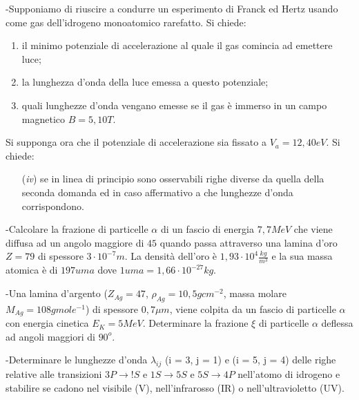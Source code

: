 \documentclass[12pt,twoside,a4]{article}
\begin{document}
\begin{esercizio}
	-Supponiamo di riuscire a condurre un esperimento di Franck ed Hertz usando come gas dell'idrogeno monoatomico rarefatto. Si chiede:
	\begin{enumerate}[label=(\textit{\roman*})]
		\item il minimo potenziale di accelerazione al quale il gas comincia ad emettere luce;
		\item la lunghezza d'onda della luce emessa a questo potenziale;
		\item quali lunghezze d'onda vengano emesse se il gas è immerso in un campo magnetico $B=5,10 T$.
	\end{enumerate}
	Si supponga ora che il potenziale di accelerazione sia fissato a $V_a=12,40 eV$. Si chiede:
	\begin{enumerate}[label=(\textit{\roman*})]
		\item[(\textit{iv})] se in linea di principio sono osservabili righe diverse da quella della seconda domanda ed in caso affermativo a che lunghezze d'onda corrispondono.
	\end{enumerate}
\end{esercizio}

\newpage
\begin{esercizio}
	-Calcolare la frazione di particelle $\alpha$ di un fascio di energia $7,7 MeV$ che viene diffusa ad un angolo maggiore di $45$ quando passa attraverso una lamina d'oro $Z=79$ di spessore $3 \cdot 10^{-7}m$. La densità  dell'oro è $1,93 \cdot 10^4 \frac{kg}{m^3}$ e la sua massa atomica è di $197 uma$ dove $1 uma= 1,66 \cdot 10^{-27}kg$.
\end{esercizio}

\begin{esercizio}
	-Una lamina d'argento ($Z_{Ag} = 47$, $\rho_{Ag} = 10,5 g cm^{-2}$, massa molare $M_{Ag} = 108 g mole^{-1}$) di spessore $0,7 \mu m$, viene colpita da un fascio di particelle $\alpha$ con energia cinetica $E_K = 5 MeV$. Determinare la frazione $\xi$ di particelle $\alpha$ deflessa ad angoli maggiori di $90^o$.
\end{esercizio}

\begin{esercizio}
	-Determinare le lunghezze d'onda $\lambda_{ij}$ (i = 3, j = 1) e (i = 5, j = 4) delle righe relative alle transizioni $3P \rightarrow !S$ e $1S \rightarrow 5S$ e $5S \rightarrow 4P$ nell'atomo di idrogeno e stabilire se cadono nel visibile (V), nell'infrarosso (IR) o nell'ultravioletto (UV).
\end{esercizio}
\end{document}
